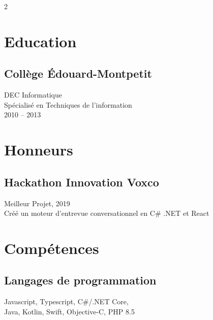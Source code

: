 \documentclass{article}
\begin{document}
\setlength{\columnsep}{4em}
\setlength{\columnseprule}{0.4pt}
\begin{paracol}{2}
  \begin{leftcolumn}
    \vspace{-2.5em}
    \section{Education}

    \subsection{Collège Édouard-Montpetit}
    DEC Informatique \\
    Spécialisé en Techniques de l'information \\
    2010 -- 2013

    \section{Honneurs}

    \subsection{Hackathon Innovation Voxco}
    \faAward\hspace{0.5em}Meilleur Projet, 2019 \\
    Créé un moteur d'entrevue conversationnel en C\# .NET et React \\

    \section{Compétences}

    \subsection{Langages de programmation}
    Javascript, Typescript, C\#/.NET Core,\\
    Java, Kotlin, Swift, Objective-C, PHP 8.5

    \vspace{0.5em}


\end{leftcolumn}
\end{paracol}
\end{document}
